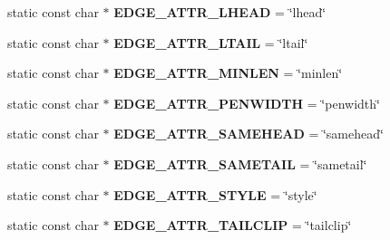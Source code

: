 \begin{DoxyCompactItemize}
\item 
static const char $\ast$ {\bfseries E\+D\+G\+E\+\_\+\+A\+T\+T\+R\+\_\+\+L\+H\+E\+AD} = \char`\"{}lhead\char`\"{}\hypertarget{classmemgraph_1_1_graphviz_attrs_af8fced30ed5723339ccf25816b860387}{}\label{classmemgraph_1_1_graphviz_attrs_af8fced30ed5723339ccf25816b860387}

\item 
static const char $\ast$ {\bfseries E\+D\+G\+E\+\_\+\+A\+T\+T\+R\+\_\+\+L\+T\+A\+IL} = \char`\"{}ltail\char`\"{}\hypertarget{classmemgraph_1_1_graphviz_attrs_a09929a681995b08ec454d0b28a1b4d1b}{}\label{classmemgraph_1_1_graphviz_attrs_a09929a681995b08ec454d0b28a1b4d1b}

\item 
static const char $\ast$ {\bfseries E\+D\+G\+E\+\_\+\+A\+T\+T\+R\+\_\+\+M\+I\+N\+L\+EN} = \char`\"{}minlen\char`\"{}\hypertarget{classmemgraph_1_1_graphviz_attrs_aaf438811c06c22f92cdb69ab744eeaf8}{}\label{classmemgraph_1_1_graphviz_attrs_aaf438811c06c22f92cdb69ab744eeaf8}

\item 
static const char $\ast$ {\bfseries E\+D\+G\+E\+\_\+\+A\+T\+T\+R\+\_\+\+P\+E\+N\+W\+I\+D\+TH} = \char`\"{}penwidth\char`\"{}\hypertarget{classmemgraph_1_1_graphviz_attrs_ad2624f27d79917a900470fc649eb2763}{}\label{classmemgraph_1_1_graphviz_attrs_ad2624f27d79917a900470fc649eb2763}

\item 
static const char $\ast$ {\bfseries E\+D\+G\+E\+\_\+\+A\+T\+T\+R\+\_\+\+S\+A\+M\+E\+H\+E\+AD} = \char`\"{}samehead\char`\"{}\hypertarget{classmemgraph_1_1_graphviz_attrs_a83483f461bae486070dd2015f9bd671a}{}\label{classmemgraph_1_1_graphviz_attrs_a83483f461bae486070dd2015f9bd671a}

\item 
static const char $\ast$ {\bfseries E\+D\+G\+E\+\_\+\+A\+T\+T\+R\+\_\+\+S\+A\+M\+E\+T\+A\+IL} = \char`\"{}sametail\char`\"{}\hypertarget{classmemgraph_1_1_graphviz_attrs_ab82baf7efbbbc77ccdf798680c7679a6}{}\label{classmemgraph_1_1_graphviz_attrs_ab82baf7efbbbc77ccdf798680c7679a6}

\item 
static const char $\ast$ {\bfseries E\+D\+G\+E\+\_\+\+A\+T\+T\+R\+\_\+\+S\+T\+Y\+LE} = \char`\"{}style\char`\"{}\hypertarget{classmemgraph_1_1_graphviz_attrs_a79cfe73ce0df9c53568551cd5434e2d5}{}\label{classmemgraph_1_1_graphviz_attrs_a79cfe73ce0df9c53568551cd5434e2d5}

\item 
static const char $\ast$ {\bfseries E\+D\+G\+E\+\_\+\+A\+T\+T\+R\+\_\+\+T\+A\+I\+L\+C\+L\+IP} = \char`\"{}tailclip\char`\"{}\hypertarget{classmemgraph_1_1_graphviz_attrs_a935d8648f78e54e460c9dd51de3399fe}{}\label{classmemgraph_1_1_graphviz_attrs_a935d8648f78e54e460c9dd51de3399fe}


\end{DoxyCompactItemize}
